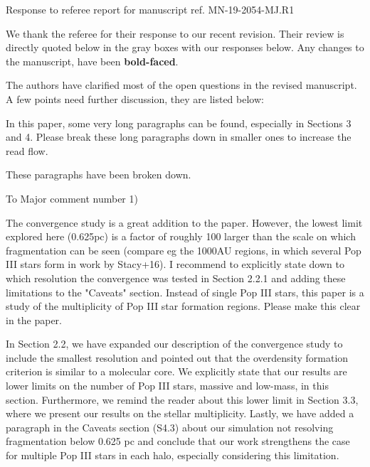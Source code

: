 \documentclass[11pt]{article}
\newenvironment{referee}[1][]{%
    \ignorespaces%
    \begin{mdframed}[style=myquotestyle,#1]%
}{%
    \end{mdframed}%
    \ignorespacesafterend%
}%
\begin{document}
\begin{center} 
\bfseries{
\begin{large}
  Response to referee report for manuscript ref. MN-19-2054-MJ.R1
\end{large}
}
\end{center}

We thank the referee for their response to our recent revision. Their review is directly quoted below in the gray boxes with our responses below.  Any changes to the manuscript, have been \textbf{bold-faced}.

\begin{referee}
    The authors have clarified most of the open questions in the revised manuscript. A few points need further discussion, they are listed below: 
\end{referee}

\begin{referee}
    In this paper, some very long paragraphs can be found, especially in Sections 3 and 4. Please break these long paragraphs down in smaller ones to increase the read flow. 
\end{referee}
    These paragraphs have been broken down. 

\begin{referee}
    To Major comment number 1) 

    The convergence study is a great addition to the paper. However, the lowest limit explored here (0.625pc) is a factor of roughly 100 larger than the scale on which fragmentation can be seen (compare eg the 1000AU regions, in which several Pop III stars form in work by Stacy+16). I recommend to explicitly state down to which resolution the convergence was tested in Section 2.2.1 and adding these limitations to the "Caveats" section. Instead of single Pop III stars, this paper is a study of the multiplicity of Pop III star formation regions. Please make this clear in the paper. 
\end{referee}
    In Section 2.2, we have expanded our description of the convergence study to include the smallest resolution and pointed out that the overdensity formation criterion is similar to a molecular core.  We explicitly state that our results are lower limits on the number of Pop III stars, massive and low-mass, in this section.  Furthermore, we remind the reader about this lower limit in Section 3.3, where we present our results on the stellar multiplicity.  Lastly, we have added a paragraph in the Caveats section (S4.3) about our simulation not resolving fragmentation below 0.625 pc and conclude that our work strengthens the case for multiple Pop III stars in each halo, especially considering this limitation.
    
\end{document}
